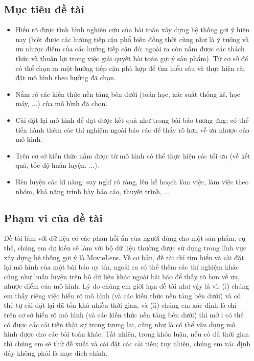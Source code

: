 \documentclass{article}[14pt]
\begin{document}
{    \subsection{Mục tiêu đề tài}
    
\begin{itemize}
\item     Hiểu rõ được tình hình nghiên cứu của bài toán xây dựng hệ thống gợi ý
 hiện nay (biết được các hướng tiếp cận phổ biến đồng thời cũng như là ý tưởng 
 và ưu nhược điểm của các hướng tiếp cận đó; ngoài ra còn nắm được các 
 thách thức và thuận lợi trong việc giải quyết bài toán gợi ý sản phẩm). Từ cơ 
 sở đó có thể chọn ra một hướng tiếp cận phù hợp để tìm hiểu sâu và thực hiện 
 cài đặt mô hình theo hướng đã chọn.
\item      Nắm rõ các kiến thức nền tảng bên dưới (toán học, xác suất thống kê, 
học máy, ...) của mô hình đã chọn.
\item     Cài đặt lại mô hình  để đạt được kết quả như trong bài báo tương ứng; 
có thể tiến hành thêm các thí nghiệm ngoài báo cáo để thấy rõ hơn về ưu nhược 
của mô hình.
\item     Trên cơ sở kiến thức nắm được từ mô hình có thể thực hiện các tối ưu 
(về kết quả, tốc độ huấn luyện, ...).
\item     Rèn luyện các kĩ năng: suy nghĩ rõ ràng, lên kế hoạch làm việc, 
làm việc theo nhóm, khả năng trình bày báo cáo, thuyết trình, ...
\end{itemize}


    
    \subsection{Phạm vi của đề tài}
    
    Đề tài làm với dữ liệu có các phản hồi ẩn của người dùng cho một sản 
phẩm; cụ thể, chúng em dự kiến sẽ làm với bộ dữ liệu thường được sử  
dụng trong lĩnh vực xây dựng  hệ thống gợi ý là MovieLens.
    Về cơ bản, đề tài chỉ tìm hiểu và cài đặt lại mô hình của một bài báo uy 
tín, ngoài ra có thể thêm các thí nghiệm khác cũng như huấn luyện trên 
bộ dữ liệu khác ngoài bài báo để thấy rõ hơn về ưu, nhược điểm của mô 
hình.
    Lý do chúng em giới hạn đề tài như vậy là vì: (i) chúng em thấy riêng 
việc hiểu rõ mô hình (và các kiến thức nền tảng bên dưới) và có thể tự 
cài đặt lại đã tốn khá nhiều thời gian, và (ii) chúng em xác định là chỉ 
trên cơ sở hiểu rõ mô hình (và các kiến thức nền tảng bên dưới) thì mớ i 
có thể có được các cải tiến thật sự trong tương lai, cũng như là có thể 
vận dụng mô hình được cho các bài toán khác.
    Tất nhiên, trong khóa luận, nếu có đủ thời gian thì chúng em sẽ thử đề 
xuất và cài đặt các cải tiến; tuy nhiên, chúng em xác định đây không 
phải là mục đích chính.
    
}
\end{document}
